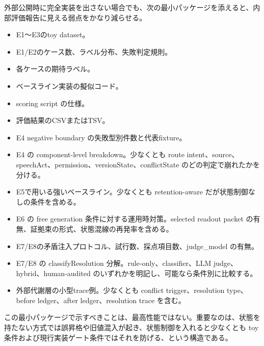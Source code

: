 \documentclass[12pt,a4paper]{article}
\begin{document}
外部公開時に完全実装を出さない場合でも、次の最小パッケージを添えると、内部評価報告に見える弱点をかなり減らせる。

\begin{itemize}
\tightlist
\item
  E1〜E3のtoy dataset。
\item
  E1/E2のケース数、ラベル分布、失敗判定規則。
\item
  各ケースの期待ラベル。
\item
  ベースライン実装の擬似コード。
\item
  scoring script の仕様。
\item
  評価結果のCSVまたはTSV。
\item
  E4 negative boundary の失敗型別件数と代表fixture。
\item
  E4 の component-level breakdown。少なくとも route intent、source、speechAct、permission、versionState、conflictState のどの判定で崩れたかを分ける。
\item
  E5で用いる強いベースライン。少なくとも retention-aware だが状態制御なしの条件を含める。
\item
  E6 の free generation 条件に対する運用時対策。selected readout packet の有無、証拠束の形式、状態混線の再発率を含める。
\item
  E7/E8の矛盾注入プロトコル、試行数、採点項目数、judge\_model の有無。
\item
  E7/E8 の classifyResolution 分解。rule-only、classifier、LLM judge、hybrid、human-audited のいずれかを明記し、可能なら条件別に比較する。
\item
  外部代謝層の小型trace例。少なくとも conflict trigger、resolution type、before ledger、after ledger、resolution trace を含む。
\end{itemize}

この最小パッケージで示すべきことは、最高性能ではない。重要なのは、状態を持たない方式では誤昇格や旧値混入が起き、状態制御を入れると少なくとも toy 条件および現行実装ゲート条件ではそれを防げる、という構造である。
\end{document}

